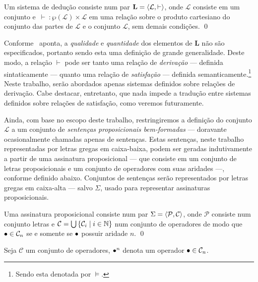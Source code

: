 \begin{definition}[Sistema]
    Um sistema de dedução consiste num par $\mathbf{L} = \langle\mathcal{L}, \vdash\rangle$, onde $\mathcal{L}$ consiste em um conjunto e $\, \vdash \: : \wp(\mathcal{L}) \times \mathcal{L}$ em uma relação sobre o produto cartesiano do conjunto das partes de $\mathcal{L}$ e o conjunto $\mathcal{L}$, sem demais condições.
    \qed{}
\end{definition}

Conforme~\cite{Beziau} aponta, a \emph{qualidade} e \emph{quantidade} dos elementos de $\mathbf{L}$ não são especificados, portanto sendo esta uma definição de grande generalidade. Deste modo, a relação $\vdash$ pode ser tanto uma relação de \emph{derivação} --- definida sintaticamente --- quanto uma relação de \emph{satisfação} --- definida semanticamente.\footnote{Sendo esta denotada por $\mathrel{\vDash}$.} Neste trabalho, serão abordados apenas sistemas definidos sobre relações de derivação. Cabe destacar, entretanto, que nada impede a tradução entre sistemas definidos sobre relações de satisfação, como veremos futuramente.

Ainda, com base no escopo deste trabalho, restringiremos a definição do conjunto $\mathcal{L}$ a um conjunto de \emph{sentenças proposicionais bem-formadas} --- doravante ocasionalmente chamadas apenas de sentenças. Estas sentenças, neste trabalho representadas por letras gregas em caixa-baixa, podem ser geradas indutivamente a partir de uma assinatura proposicional --- que consiste em um conjunto de letras proposicionais e um conjunto de operadores com suas aridades ---, conforme definido abaixo. Conjuntos de sentenças serão representados por letras gregas em caixa-alta --- salvo $\Sigma$, usado para representar assinaturas proposicionais.

\begin{definition}[Assinatura]
    Uma assinatura proposicional consiste num par $\Sigma=\langle\mathcal{P},\mathcal{C}\rangle$, onde $\mathcal{P}$ consiste num conjunto letras e $\mathcal{C}=\bigcup\left\{\mathcal{C}_i\mid i\in\mathbb{N}\right\}$ num conjunto de operadores de modo que $\mathalpha{\bullet}\in\mathcal{C}_n$ se e somente se $\mathalpha{\bullet}$ possuir aridade $n$.
    \qed{}
\end{definition}

\begin{notation}
    Seja $\mathcal{C}$ um conjunto de operadores, $\mathalpha{\bullet}^n$ denota um operador $\mathalpha{\bullet}\in\mathcal{C}_n$.
\end{notation}

